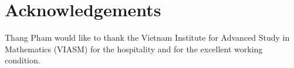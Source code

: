 \documentclass[11pt]{article}
\def\Ebf{\textbf{E}}
\begin{document}




\section{Acknowledgements}
Thang Pham would like to thank the Vietnam Institute for Advanced Study in Mathematics (VIASM) for the hospitality and for the excellent working condition.
\end{document}
